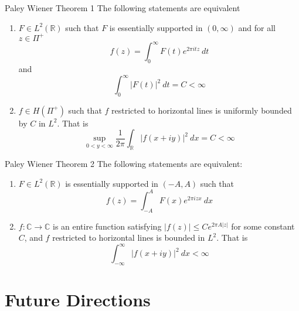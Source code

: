 \documentclass[compress]{beamer}
\newcommand{\R}{\mathbb R}
\newcommand{\C}{\mathbb C}
\begin{document}
\begin{frame}{Paley Wiener Theorem 1}
  The following statements are equivalent
  \begin{enumerate}
    \item $F \in L^2(\R)$ such that $F$ is essentially supported in $(0, \infty)$ and for all $z \in \Pi^+$ 
      \begin{equation}
        f(z) = \int_0^\infty F(t) e^{2\pi it z} \ dt
        \label{eq:dfjalsjfeli}
      \end{equation}
      and $$\int_0^\infty |F(t)|^2 \ dt = C < \infty$$
    \pause
    \item $f \in H(\Pi^+)$ such that $f$ restricted to horizontal lines is uniformly bounded by $C$ in $L^2$. That is
      \begin{equation}
        \sup_{0<y<\infty} \frac{1}{2\pi}\int_\R \left|f(x+iy) \right|^2 \ dx = C < \infty
        \label{eq:paley_wiener_1}
      \end{equation}
  \end{enumerate}
\end{frame}

\begin{frame}{Paley Wiener Theorem 2}
    The following statements are equivalent:
      \begin{enumerate}
        \item $F \in L^2(\R)$ is essentially supported in $(-A, A)$ such that
          \begin{equation}
          f(z) = \int_{-A}^A F(x) e^{2\pi iz x} \ dx
          \label{eq:pw_thm_2}
        \end{equation}
          \pause
        \item $f: \C \to \C$ is an entire function satisfying $|f(z)| \le Ce^{2\pi A |z|}$ for some constant $C$, and $f$ restricted to horizontal lines is bounded in $L^2$. That is 
          \begin{equation}
            \int_{-\infty}^\infty |f(x+iy)|^2 \ dx < \infty
            \label{eq:pw_thm_2.1}
          \end{equation}
      \end{enumerate}
\end{frame}


\section{Future Directions}
\end{document}

